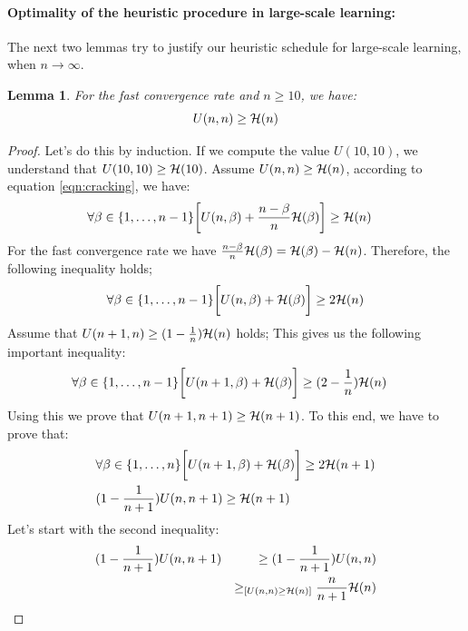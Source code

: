 \documentclass{article}
\newtheorem{lemma}{Lemma}
\newcommand{\bound}{{\cal H}}
\begin{document}
\paragraph{Optimality of the heuristic procedure in large-scale learning:}
The next two lemmas try to justify our heuristic schedule for large-scale
learning, when $n \to \infty$.
\begin{lemma} \label{lemma:lowerbound_fast}
	For the fast convergence rate and $n\geq 10$, we have: 
	\begin{equation*}
		U(n,n) \geq \bound(n)
	\end{equation*}
\end{lemma}
\begin{proof}
	Let's do this by induction. If we compute the 
	value $U(10,10)$, we understand that $U(10,10)\geq \bound(10)$. 
	Assume $U(n,n)\geq \bound(n)$, according to equation \ref{eqn:cracking}, we
	have: 
	\begin{eqnarray*}
       &  \forall \beta \in \{1,\ldots,n-1\}\bigg[U(n,\beta) +
       \frac{n-\beta}{n} \bound(\beta) \bigg] \geq \bound(n) 
	\end{eqnarray*}
	For the fast convergence rate we have $\frac{n-\beta}{n} \bound(\beta) =
	\bound(\beta) -\bound(n)$. Therefore, the following inequality holds;
	\begin{equation}
		\forall \beta \in \{1,\ldots,n-1\}\bigg[U(n,\beta) +
        \bound(\beta) \bigg] \geq 2\bound(n) \label{eqn:lowerbound_n}
	\end{equation}
	Assume that $U(n+1,n)\geq (1-\frac{1}{n})\bound(n)$ holds; This gives us the
	following important inequality: 
	\begin{eqnarray}
       &  \forall \beta \in \{1,\ldots,n-1\}\bigg[U(n+1,\beta) +
       \bound(\beta) \bigg] \geq (2-\frac{1}{n})\bound(n) \label{eqn:n_plus}
	\end{eqnarray}
	 Using this we prove that $U(n+1,n+1)\geq
	\bound(n+1)$.
	To this end, we have to prove that:
	\begin{eqnarray}
       &  \forall \beta \in \{1,\ldots,n \}\bigg[U(n+1,\beta) +
        \bound(\beta) \bigg] \geq 2\bound(n+1) 
       \label{eqn:lowerbound_condition_1} \\
       & (1-\frac{1}{n+1}) U(n,n+1) \geq \bound(n+1) 
	\end{eqnarray}
	Let's start with the second inequality: 
	\begin{eqnarray}
       & (1-\frac{1}{n+1}) U(n,n+1) & \geq (1-\frac{1}{n+1}) U(n,n) \\
       & & \geq_{[U(n,n)\geq \bound(n)]} \frac{n}{n+1} \bound(n) \\

\end{eqnarray}
\end{proof}
\end{document}

